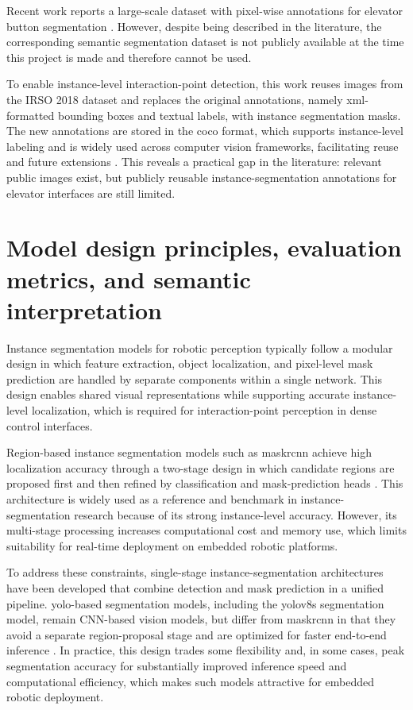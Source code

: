 Recent work reports a large-scale dataset with pixel-wise annotations for elevator
button segmentation \citep{liu2021elevator}. However, despite being described in the
literature, the corresponding semantic segmentation dataset is not publicly
available at the time this project is made and therefore cannot be used.

To enable instance-level interaction-point detection, this work reuses images from
the IRSO 2018 dataset and replaces the original annotations, namely
\gls{xml}-formatted bounding boxes and textual labels, with instance
segmentation masks. The new annotations are stored in the \gls{coco} format,
which supports instance-level labeling and is widely used across computer vision
frameworks, facilitating reuse and future extensions \citep{lin2014coco}. This
reveals a practical gap in the literature: relevant public images exist, but
publicly reusable instance-segmentation annotations for elevator interfaces are
still limited.

\section{Model design principles, evaluation metrics, and semantic interpretation}

Instance segmentation models for robotic perception typically follow a modular
design in which feature extraction, object localization, and pixel-level mask
prediction are handled by separate components within a single network. This design
enables shared visual representations while supporting accurate instance-level
localization, which is required for interaction-point perception in dense control
interfaces.

Region-based instance segmentation models such as \gls{maskrcnn} achieve high
localization accuracy through a two-stage design in which candidate regions are
proposed first and then refined by classification and mask-prediction heads
\citep{he2017maskrcnn}. This architecture is widely used as a reference and
benchmark in instance-segmentation research because of its strong instance-level
accuracy. However, its multi-stage processing increases computational cost and
memory use, which limits suitability for real-time deployment on embedded robotic
platforms.

To address these constraints, single-stage instance-segmentation architectures
have been developed that combine detection and mask prediction in a unified
pipeline. \gls{yolo}-based segmentation models, including the \gls{yolo}v8s
segmentation model, remain CNN-based vision models, but differ from
\gls{maskrcnn} in that they avoid a separate region-proposal stage and are
optimized for faster end-to-end inference \citep{jocher2023yolov8}. In practice,
this design trades some flexibility and, in some cases, peak segmentation
accuracy for substantially improved inference speed and computational efficiency,
which makes such models attractive for embedded robotic deployment.

